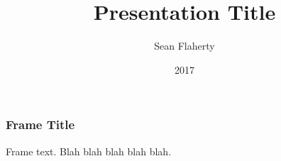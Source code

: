 \documentclass{beamer}
\title{Presentation Title}
\author{Sean Flaherty}
\institute{Texas Tech University}
\date{2017}
\begin{document}
\frame{\titlepage}
\begin{frame}
	\frametitle{Frame Title}
	Frame text. Blah blah blah blah blah.
\end{frame}
\end{document}
